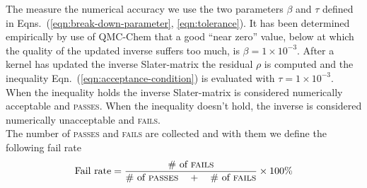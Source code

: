 \documentclass[11pt]{article}
\numberwithin{figure}{section}
\numberwithin{table}{section}
\begin{document}
      The measure the numerical accuracy we use the two parameters $\beta$ and $\tau$ defined in Eqns.~(\ref{eqn:break-down-parameter}, \ref{eqn:tolerance}). It has been determined empirically by use of QMC-Chem that a good ``near zero'' value, below at which the quality of the updated inverse suffers too much, is $\beta=1\times 10^{-3}$. After a kernel has updated the inverse Slater-matrix the residual $\rho$ is computed and the inequality Eqn.~(\ref{eqn:acceptance-condition}) is evaluated with $\tau=1\times 10^{-3}$. When the inequality holds the inverse Slater-matrix is considered numerically acceptable and \textsc{passes}. When the inequality doesn't hold, the inverse is considered numerically unacceptable and \textsc{fails}.\\
    	
    	The number of \textsc{passes} and \textsc{fails} are collected and with them we define the following fail rate
    	\begin{align}
    	 \text{Fail rate} = \frac{\text{\# of }\textsc{fails}}{\text{\# of }\textsc{passes}\quad+\quad\text{\# of }\textsc{fails}}\times100\%
    	\end{align}
    	
\end{document}
